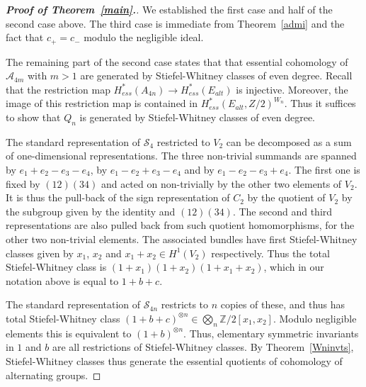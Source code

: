 \documentclass{article}
\theoremstyle{plain}
\theoremstyle{definition}
\newcommand{\Z}{\mathbb{Z}}
\newcommand{\si}{\mathcal{S}}
\newcommand{\alt}{\mathcal{A}}
\begin{document}
\begin{proof} 
[{\bf Proof of Theorem~\ref{main}.}]
    We established the first case and half of the second case above.  The third case is immediate from Theorem~\ref{admi} and the fact that $c_+ = c_-$
    modulo the negligible ideal.
    
    The remaining part of the second case states that that essential cohomology
    of $\alt_{4m}$ with $m>1$
    are generated by Stiefel-Whitney classes of even degree.
    Recall that the restriction map $H^*_{ess}(A_{4n}) \to H^*_{ess}(E_{alt})$ is injective. Moreover, the image of this restriction map is contained in
$H^*_{ess}(E_{alt},Z/2)^{W_n}$. Thus it suffices to show that
$Q_n$ is generated by Stiefel-Whitney classes of even degree.

    The standard representation of $\si_4$ restricted to $V_2$ can
    be decomposed as a sum of one-dimensional representations.  The three non-trivial
    summands are spanned by $e_1 + e_2 - e_ 3 - e_4$, by 
    $e_1 - e_2 + e_3 - e_4$ and by $e_1 - e_2 - e_3 + e_4$.
    The first one is fixed by $(12)(34)$ and acted on non-trivially
    by the other two elements of $V_2$.  It is thus the pull-back
    of the sign representation of $C_2$ by the quotient of $V_2$
    by the subgroup given by the identity and $(12)(34)$.
    The second and third representations are also pulled back
    from such quotient homomorphisms, for the other two 
    non-trivial elements.
    The associated bundles have first Stiefel-Whitney classes given by $x_1$, $x_2$
    and $x_1 + x_2 \in H^1(V_2 )$ respectively.  Thus the total
    Stiefel-Whitney class is $(1 + x_1)(1+ x_2)(1 + x_1 + x_2)$,
    which in our notation above is equal to $1 + b + c$.

    The standard representation of $\si_{4n}$  restricts to 
    $n$ copies of these, and thus has total Stiefel-Whitney
    class $(1 + b + c)^{\otimes n} \in \bigotimes_n  \Z/2[x_1, x_2]$.  Modulo  negligible elements this is
    equivalent to $(1+b)^{\otimes n}$.  Thus, elementary symmetric invariants in $1$ and $b$
    are all restrictions of Stiefel-Whitney classes.  By 
    Theorem~\ref{Wninvts}, 
    Stiefel-Whitney classes 
    thus generate the essential quotients of cohomology
    of alternating groups.  


\end{proof}
\end{document}
